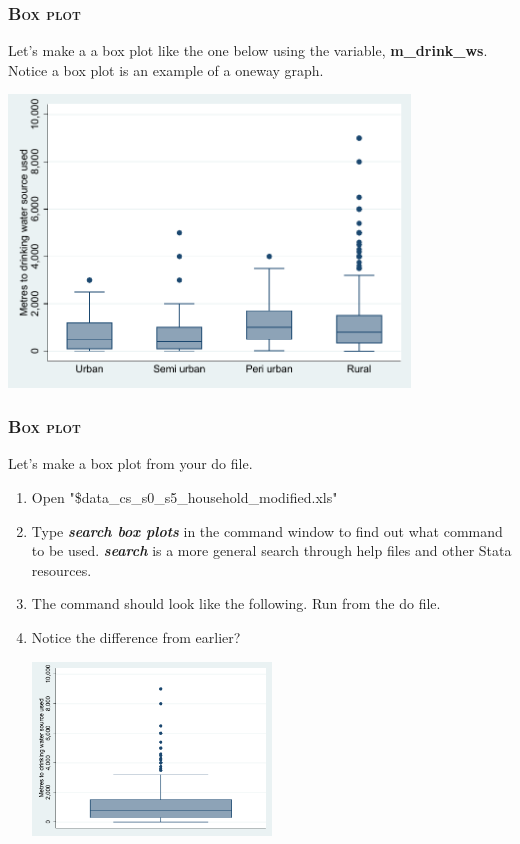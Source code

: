 \documentclass[10pt]{beamer}
\begin{document}
	\begin{frame}
	\frametitle{\textsc{Box plot}}
		Let's make a a box plot like the one below using the variable, \textbf{m\_drink\_ws}.
		Notice a box plot is an example of a oneway graph. 
\begin{center}
    \includegraphics[width=0.8\textwidth]{boxplot_1.pdf}
\end{center}
	\end{frame}
	
	\begin{frame}
	\frametitle{\textsc{Box plot}}	
		 Let's make a box plot from your do file.
		\begin{enumerate}
			 \item Open "\$data\_cs\_s0\_s5\_household\_modified.xls"
			 \item Type \textbf{\textit{search box plots}} in the command window to find out what command to be used.
					\textbf{\textit{search}} is a more general search through help files and other Stata resources.
			 \onslide<2-> \item The command should look like the following. Run from the do file.
		
\begin{stlog}\end{stlog}
			\vspace{1mm}
			 \item Notice the difference from earlier? 
			\vspace{1mm}			
		
\begin{center}
    \includegraphics[width=0.5\textwidth]{boxplot_2.pdf}
\end{center}
		\end{enumerate}
	\end{frame}
\end{document}
